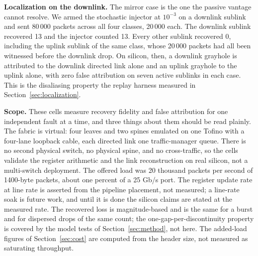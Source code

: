 \textbf{Localization on the downlink.} The mirror case is the one the passive vantage cannot resolve. We armed the stochastic injector at $10^{-3}$ on a downlink sublink and sent 80\,000 packets across all four classes, 20\,000 each. The downlink sublink recovered 13 and the injector counted 13. Every other sublink recovered 0, including the uplink sublink of the same class, whose 20\,000 packets had all been witnessed before the downlink drop. On silicon, then, a downlink grayhole is attributed to the downlink directed link alone and an uplink grayhole to the uplink alone, with zero false attribution on seven active sublinks in each case. This is the disaliasing property the replay harness measured in Section~\ref{sec:localization}.

\textbf{Scope.} These cells measure recovery fidelity and false attribution for one independent fault at a time, and three things about them should be read plainly. The fabric is virtual: four leaves and two spines emulated on one Tofino with a four-lane loopback cable, each directed link one traffic-manager queue. There is no second physical switch, no physical spine, and no cross-traffic, so the cells validate the register arithmetic and the link reconstruction on real silicon, not a multi-switch deployment. The offered load was 20 thousand packets per second of 1400-byte packets, about one percent of a 25 Gb/s port. The register update rate at line rate is asserted from the pipeline placement, not measured; a line-rate soak is future work, and until it is done the silicon claims are stated at the measured rate. The recovered loss is magnitude-based and is the same for a burst and for dispersed drops of the same count; the one-gap-per-discontinuity property is covered by the model tests of Section~\ref{sec:method}, not here. The added-load figures of Section~\ref{sec:cost} are computed from the header size, not measured as saturating throughput.

